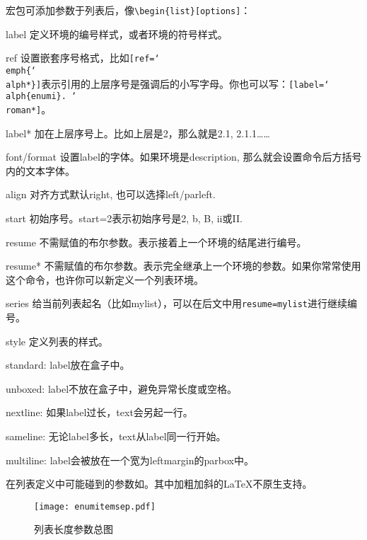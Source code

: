 宏包可添加参数于列表后，像\verb|\begin{list}[options]|：
\begin{para}
\item[label] 定义环境的编号样式，或者环境的符号样式。
\item[ref] 设置嵌套序号格式，比如\texttt{[ref=\char`\\emph\{\char`\\alph*\}]}表示引用的上层序号是强调后的小写字母。你也可以写：\texttt{[label=\char`\\alph\{enumi\}.\ \char`\\roman*]}。
\item[label*] 加在上层序号上。比如上层是2，那么就是2.1, 2.1.1……
\item[font/format] 设置label的字体。如果环境是description, 那么就会设置命令后方括号内的文本字体。
\item[align] 对齐方式默认right, 也可以选择left/parleft.
\item[start] 初始序号。start=2表示初始序号是2, b, B, ii或II.
\item[resume] 不需赋值的布尔参数。表示接着上一个环境的结尾进行编号。
\item[resume*] 不需赋值的布尔参数。表示完全继承上一个环境的参数。如果你常常使用这个命令，也许你可以新定义一个列表环境。
\item[series] 给当前列表起名（比如mylist），可以在后文中用\texttt{resume=mylist}进行继续编号。
\item[style] 定义列表的样式。
\begin{para}
\item[standard:] label放在盒子中。
\item[unboxed:] label不放在盒子中，避免异常长度或空格。
\item[nextline:] 如果label过长，text会另起一行。
\item[sameline:] 无论label多长，text从label同一行开始。
\item[multiline:] label会被放在一个宽为leftmargin的parbox中。
\end{para}
\end{para}

在列表定义中可能碰到的参数如。其中加粗加斜的\LaTeX 不原生支持。
\begin{figure}[!hbt]
\texttt{[image: enumitemsep.pdf]}
\caption{列表长度参数总图}
\label{fig:enumitemsep}
\end{figure}

